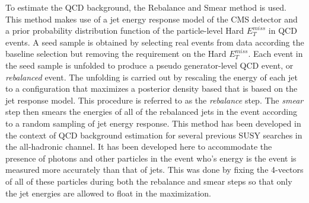 To estimate the QCD background, the Rebalance and Smear method is used.  This method makes use of a jet energy response model of the CMS detector and a prior probability distribution function of the particle-level Hard $E_T^{miss}$ in QCD events.  A seed sample is obtained by selecting real events from data according the baseline selection but removing the requirement on the Hard $E_T^{miss}$.  Each event in the seed sample is unfolded to produce a pseudo generator-level QCD event, or \textit{rebalanced} event.  The unfolding is carried out by rescaling the energy of each jet to a configuration that maximizes a posterior density based that is based on the jet response model.  This procedure is referred to as the \textit{rebalance} step.  The \textit{smear} step then smears the energies of all of the rebalanced jets in the event according to a random sampling of jet energy response.  This method has been developed in the context of QCD background estimation for several previous SUSY searches in the all-hadronic channel.  It has been developed here to accommodate the presence of photons and other particles in the event who's energy is the event is measured more accurately than that of jets.  This was done by fixing the 4-vectors of all of these particles during both the rebalance and smear steps so that only the jet energies are allowed to float in the maximization.


